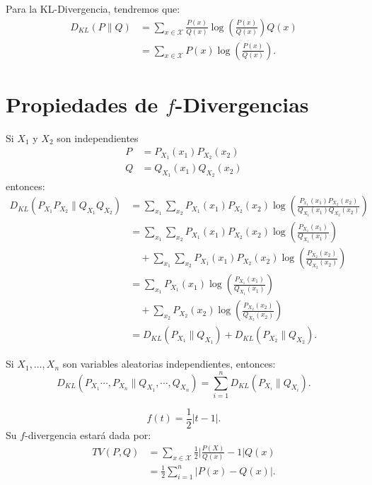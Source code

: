 \begin{example}
Para la KL-Divergencia, tendremos que:
\begin{align*}
    D_{KL}(P\|Q)&=\sum_{x\in\mathcal{X}}\frac{P(x)}{Q(x)}\log\left(\frac{P(x)}{Q(x)}\right)Q(x)\\
    &=\sum_{x\in\mathcal{X}}P(x)\log\left(\frac{P(x)}{Q(x)}\right).
\end{align*}
\end{example}
\section{Propiedades de $f$-Divergencias}
\begin{example}
    Si $X_1$ y $X_2$ son independientes
    \begin{align*}
        P&=P_{X_1}(x_1)P_{X_2}(x_2)\\
        Q&=Q_{X_1}(x_1)Q_{X_2}(x_2)
    \end{align*}
    entonces:
    \begin{align*}
        D_{KL}(P_{X_1}P_{X_2}\|Q_{X_1}Q_{X_2})&=\sum_{x_1}\sum_{x_2}P_{X_1}(x_1)P_{X_2}(x_2)\log\left(\frac{P_{x_1}(x_1)P_{X_2}(x_2)}{Q_{X_1}(x_1)Q_{X_2}(x_2)}\right)\\
        &=\sum_{x_1}\sum_{x_2}P_{X_1}(x_1)P_{X_2}(x_2)\log\left(\frac{P_{X_1}(x_1)}{Q_{X_1}(x_1)}\right)\\
        &\quad+\sum_{x_1}\sum_{x_2}P_{X_1}(x_1)P_{X_2}(x_2)\log\left(\frac{P_{X_2}(x_2)}{Q_{X_2}(x_2)}\right)\\
        &=\sum_{x_1}P_{X_1}(x_1)\log\left(\frac{P_{X_1}(x_1)}{Q_{X_1}(x_1)}\right)\\
        &\quad+\sum_{x_2}P_{X_2}(x_2)\log\left(\frac{P_{X_2}(x_2)}{Q_{X_2}(x_2)}\right)\\
        &=D_{KL}(P_{X_1}\|Q_{X_1})+D_{KL}(P_{X_2}\|Q_{X_2}).
    \end{align*}
\end{example}

\begin{theorem}
Si $X_1,\dots,X_n$ son variables aleatorias independientes, entonces:
\begin{equation*}
    D_{KL}(P_{X_1}\cdots,P_{X_n}\|Q_{X_1},\cdots,Q_{X_n})=\sum_{i=1}^{n}D_{KL}(P_{X_i}\|Q_{X_i}).
\end{equation*}
\end{theorem}

\begin{example}
 \begin{equation*}
     f(t)=\frac{1}{2}|t-1|.
 \end{equation*}
Su $f$-divergencia estar\'a dada por:
\begin{align*}
    TV(P,Q)&=\sum_{x\in\mathcal{X}}\frac{1}{2}\bigg|\frac{P(X)}{Q(x)}-1\bigg|Q(x)\\
    &=\frac{1}{2}\sum_{i=1}^{n}|P(x)-Q(x)|.
\end{align*}
\end{example}


